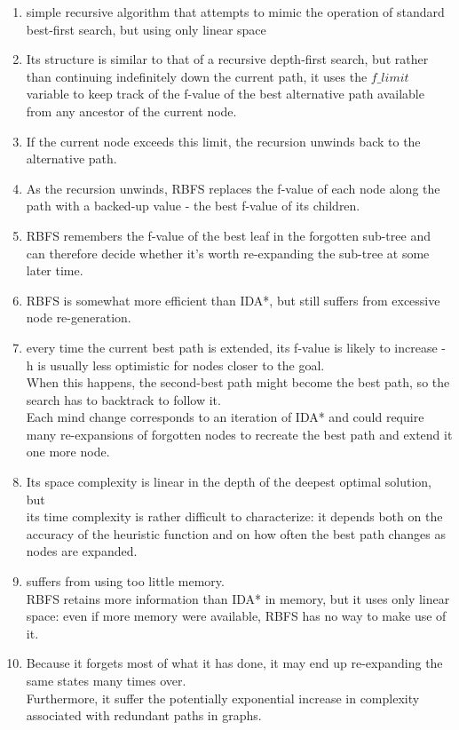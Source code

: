 \begin{enumerate}
    \item simple recursive algorithm that attempts to mimic the operation of standard best-first search, but using only linear space

    \item Its structure is similar to that of a recursive depth-first search, but rather than continuing indefinitely down the current path, it uses the $f\_limit$ variable to keep track of the f-value of the best alternative path available from any ancestor of the current node. 
    
    \item If the current node exceeds this limit, the recursion unwinds back to the alternative path. 
    
    \item As the recursion unwinds, RBFS replaces the f-value of each node along the path with a backed-up value - the best f-value of its children. 
    
    \item RBFS remembers the f-value of the best leaf in the forgotten sub-tree and can therefore decide whether it’s worth re-expanding the sub-tree at some later time.

    \item RBFS is somewhat more efficient than IDA*, but still suffers from excessive node re-generation.

    \item every time the current best path is extended, its f-value is likely to increase - h is usually less optimistic for nodes closer to the goal.\\
    When this happens, the second-best path might become the best path, so the search has to backtrack to follow it.\\
    Each mind change corresponds to an iteration of IDA* and could require many re-expansions of forgotten nodes to recreate the best path and extend it one more node.

    \item Its space complexity is linear in the depth of the deepest optimal solution, but\\
    its time complexity is rather difficult to characterize: it depends both on the accuracy of the heuristic function and on how often the best path changes as nodes are expanded.

    \item suffers from using too little memory.\\
    RBFS retains more information than IDA* in memory, but it uses only linear space: even if more memory were available, RBFS has no way to make use of it. 

    \item Because it forgets most of what it has done, it may end up re-expanding the same states many times over. \\
    Furthermore, it suffer the potentially exponential increase in complexity associated with redundant paths in graphs.
\end{enumerate}


